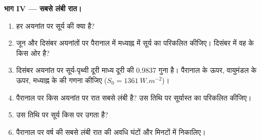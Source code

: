 \begin{problem}
\medskip
\noindent\textbf{भाग IV --- सबसे लंबी रात।}
\begin{enumerate}[resume]
  \item हर अयनांत पर सूर्य की  क्या है?
  \item जून और दिसंबर अयनांतों पर पैरानाल में मध्याह्न में सूर्य का  परिकलित कीजिए। दिसंबर
        में वह  के किस ओर है?
  \item दिसंबर अयनांत पर सूर्य-पृथ्वी दूरी माध्य दूरी की 0.9837 गुना है। पैरानाल के ऊपर, वायुमंडल
        के ऊपर, मध्याह्न के  की गणना कीजिए ($S_0 = \qty{1361}{W.m^{-2}}$)।
  \item पैरानाल पर किस अयनांत पर रात सबसे लंबी है? उस तिथि पर सूर्यास्त का  परिकलित कीजिए।
  \item उस तिथि पर सूर्य किस  पर उगता है?
  \item पैरानाल पर वर्ष की सबसे लंबी रात की अवधि घंटों और मिनटों में निकालिए।
\end{enumerate}
\end{problem}
